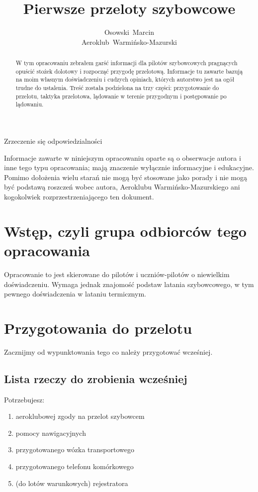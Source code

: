 \documentclass{article}
\title{Pierwsze przeloty szybowcowe}
\author{Osowski~Marcin\\Aeroklub~Warmińsko-Mazurski}
\begin{document}
\maketitle
\newpage

\begin{abstract}
W tym opracowaniu zebrałem garść informacji dla pilotów szybowcowych
pragnących opuścić stożek dolotowy i rozpocząć
przygodę przelotową. Informacje tu zawarte bazują na moim
własnym doświadczeniu i cudzych opiniach, których autorstwo jest na ogół
trudne do ustalenia. Treść została podzielona na trzy części:
przygotowanie do przelotu, taktyka przelotowa, 
lądowanie w terenie przygodnym i postępowanie po lądowaniu.
\end{abstract}
\newpage

\begin{center}\begin{huge}
Zrzeczenie się odpowiedzialności
\end{huge}\end{center}
Informacje zawarte w niniejszym opracowaniu oparte są o obserwacje
autora i inne tego typu opracowania; mają znaczenie wyłącznie informacyjne
i edukacyjne. Pomimo dołożenia wielu starań nie mogą być stosowane
jako porady i nie mogą być podstawą roszczeń wobec autora,
Aeroklubu Warmińsko-Mazurskiego ani kogokolwiek rozprzestrzeniającego
ten dokument.
\newpage


\tableofcontents
\newpage


\section{Wstęp, czyli grupa odbiorców tego opracowania}
Opracowanie to jest skierowane do pilotów i uczniów-pilotów o niewielkim
doświadczeniu. Wymaga jednak znajomość podstaw latania szybowcowego, w tym
pewnego doświadczenia w lataniu termicznym.
\newpage


\section{Przygotowania do przelotu}
Zacznijmy od wypunktowania tego co należy przygotować wcześniej.

\subsection{Lista rzeczy do zrobienia wcześniej}
Potrzebujesz:
\begin{enumerate}
\item aeroklubowej zgody na przelot szybowcem
\item pomocy nawigacyjnych
\item przygotowanego wózka transportowego
\item przygotowanego telefonu komórkowego
\item (do lotów warunkowych) rejestratora
\end{enumerate}
\end{document}
